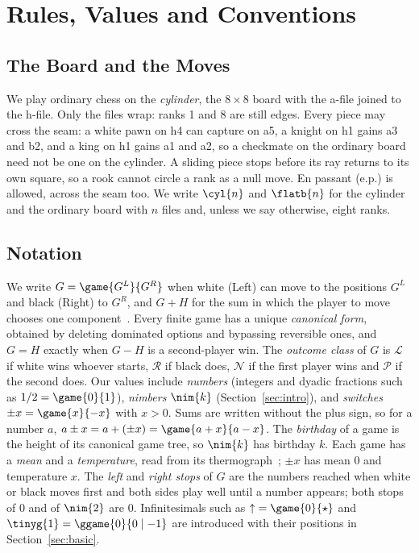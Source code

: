 \section{Rules, Values and Conventions}\label{sec:rules}

\subsection{The Board and the Moves}
We play ordinary chess on the \emph{cylinder}, the $8\times8$ board with the a-file joined to the h-file. Only
the files wrap: ranks 1 and 8 are still edges. Every piece may cross the seam: a white pawn on h4 can capture on
a5, a knight on h1 gains a3 and b2, and a king on h1 gains a1 and a2, so a checkmate on the ordinary board need
not be one on the cylinder. A sliding piece stops before its ray returns to its own square, so a rook cannot
circle a rank as a null move. En passant (e.p.) is allowed, across the seam too. We write $\cyl{n}$ and
$\flatb{n}$ for the cylinder and the ordinary board with $n$ files and, unless we say otherwise, eight ranks.

\subsection{Notation}\label{sec:notation}
We write $G=\game{G^L}{G^R}$ when white (Left) can move to the positions $G^L$ and black (Right) to $G^R$, and
$G+H$ for the sum in which the player to move chooses one component~\cite{WinningWays,ONAG,Siegel2013}. Every
finite game has a unique \emph{canonical form}, obtained by deleting dominated options and bypassing reversible
ones, and $G=H$ exactly when $G-H$ is a second-player win. The \emph{outcome class} of $G$ is $\mathcal{L}$ if
white wins whoever starts, $\mathcal{R}$ if black does, $\mathcal{N}$ if the first player wins and
$\mathcal{P}$ if the second does. Our values include \emph{numbers} (integers and dyadic fractions such as
$1/2=\game{0}{1}$), \emph{nimbers} $\nim{k}$ (Section~\ref{sec:intro}), and \emph{switches} $\pm x=\game{x}{-x}$ with $x>0$. Sums are written without the plus sign,
so for a number $a$, $a\pm x=a+(\pm x)=\game{a+x}{a-x}$. The \emph{birthday} of a game is the height of its
canonical game tree, so $\nim{k}$ has birthday $k$. Each game has a \emph{mean} and a \emph{temperature}, read
from its thermograph~\cite{WinningWays}; $\pm x$ has mean $0$ and temperature $x$. The \emph{left} and
\emph{right stops} of $G$ are the numbers reached when white or black moves first and both sides play well until a
number appears; both stops of $0$ and of $\nim{2}$ are $0$. Infinitesimals such as ${\uparrow}=\game{0}{\star}$ and
$\tinyg{1}=\ggame{0}{0\mid -1}$ are introduced with their positions in Section~\ref{sec:basic}.

